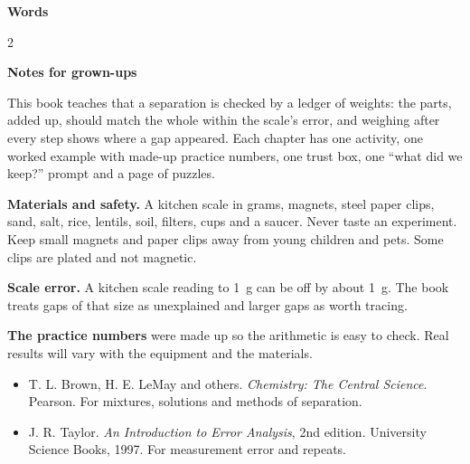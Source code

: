 \clearpage\label{notes}
{\sans\bfseries\LARGE\color{ink} Words}\par
\small
\begin{multicols}{2}
\end{multicols}

\vspace{0.4em}
{\sans\bfseries\large\color{sky!70!black} Notes for grown-ups}\par
This book teaches that a separation is checked by a ledger of weights: the parts, added up, should match the whole within the scale's error, and weighing after every step shows where a gap appeared. Each chapter has one activity, one worked example with made-up practice numbers, one trust box, one ``what did we keep?'' prompt and a page of puzzles.

\textbf{Materials and safety.} A kitchen scale in grams, magnets, steel paper clips, sand, salt, rice, lentils, soil, filters, cups and a saucer. Never taste an experiment. Keep small magnets and paper clips away from young children and pets. Some clips are plated and not magnetic.

\textbf{Scale error.} A kitchen scale reading to 1~g can be off by about 1~g. The book treats gaps of that size as unexplained and larger gaps as worth tracing.

\textbf{The practice numbers} were made up so the arithmetic is easy to check. Real results will vary with the equipment and the materials.

\begin{itemize}[leftmargin=1.3em,itemsep=0.2em]
\item T. L. Brown, H. E. LeMay and others. \emph{Chemistry: The Central Science}. Pearson. For mixtures, solutions and methods of separation.
\item J. R. Taylor. \emph{An Introduction to Error Analysis}, 2nd edition. University Science Books, 1997. For measurement error and repeats.
\end{itemize}

